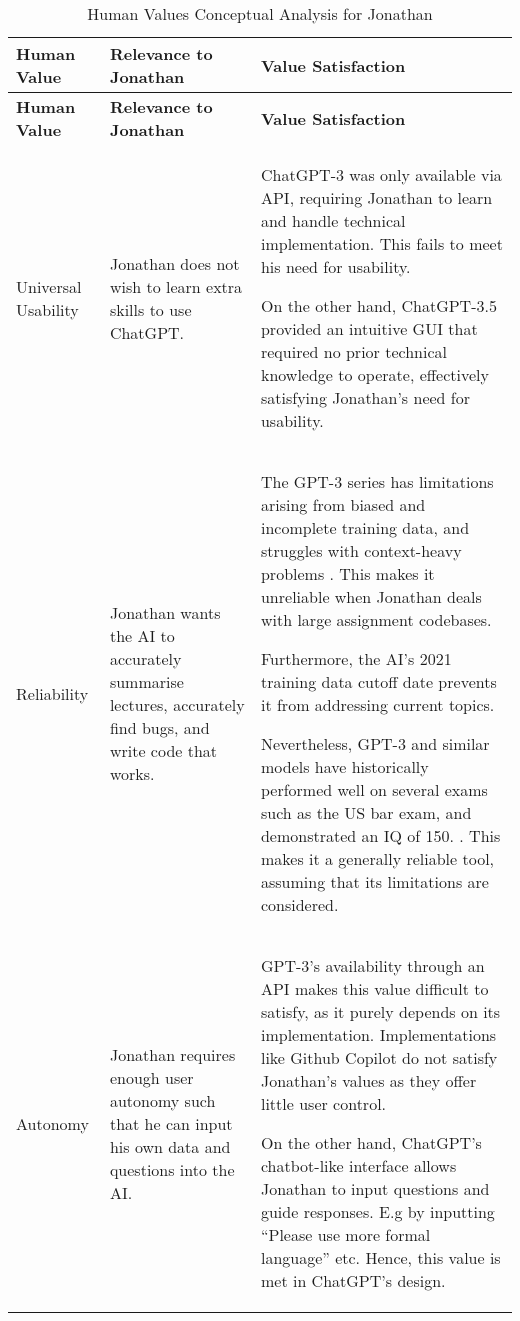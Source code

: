 \begin{longtable}{|p{}|p{}|p{}|}
\caption{Human Values Conceptual Analysis for Jonathan} \label{tab:jonathan} \\
\hline
\textbf{Human Value} & \textbf{Relevance to Jonathan} & \textbf{Value Satisfaction} \\
\hline
\endfirsthead

\hline
\textbf{Human Value} & \textbf{Relevance to Jonathan} & \textbf{Value Satisfaction} \\
\hline
\endhead

\hline
\endfoot

\hline
\endlastfoot

Universal Usability & Jonathan does not wish to learn extra skills to use ChatGPT.& ChatGPT-3 was only available via API, requiring Jonathan to learn and handle technical implementation. This fails to meet his need for usability.

On the other hand, ChatGPT-3.5 provided an intuitive GUI that required no prior technical knowledge to operate, effectively satisfying Jonathan’s need for usability.\\
\hline

Reliability & Jonathan wants the AI to accurately summarise lectures, accurately find bugs, and write code that works. & The GPT-3 series has limitations arising from biased and incomplete training data, and struggles with context-heavy problems \parencite{Ray2023}. This makes it unreliable when Jonathan deals with large assignment codebases.

Furthermore, the AI’s 2021 training data cutoff date prevents it from addressing current topics. 

Nevertheless, GPT-3 and similar models have historically performed well on several exams such as the US bar exam, and demonstrated an IQ of 150. \parencite{Ray2023}. This makes it a generally reliable tool, assuming that its limitations are considered. \\
\hline

Autonomy & Jonathan requires enough user autonomy such that he can input his own data and questions into the AI. &GPT-3’s availability through an API makes this value difficult to satisfy, as it purely depends on its implementation. Implementations like Github Copilot do not satisfy Jonathan’s values as they offer little user control. \parencite{openai_codex_2025}

On the other hand, ChatGPT’s chatbot-like interface allows Jonathan to input questions and guide responses. E.g by inputting “Please use more formal language” etc. Hence, this value is met in ChatGPT’s design.  
\\
\hline


\end{longtable}
